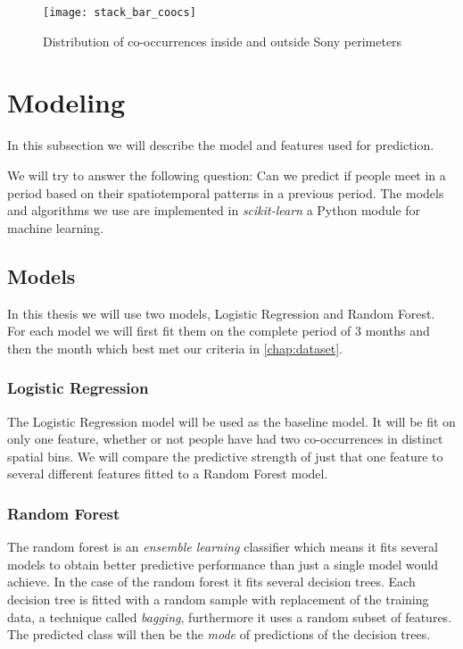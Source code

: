 \begin{figure}[H]
    \hspace*{-1.0cm}
    \centering
    \texttt{[image: stack\_bar\_coocs]}
    \caption{Distribution of co-occurrences inside and outside Sony perimeters}
    \label{fig:dist_coocs_sony}
\end{figure}

\section{Modeling}
In this subsection we will describe the model and features used for prediction.

We will try to answer the following question: Can we predict if people meet in a period based on their spatiotemporal patterns in a previous period.
The models and algorithms we use are implemented in \textit{scikit-learn}\cite{scikit-learn} a Python module for machine learning. 

\subsection{Models}
In this thesis we will use two models, Logistic Regression and Random Forest. For each model we will first fit them on the complete period of 3 months and then the month which best met our criteria in \autoref{chap:dataset}.

\subsubsection{Logistic Regression}
The Logistic Regression model will be used as the baseline model. It will be fit on only one feature, whether or not people have had two co-occurrences in distinct spatial bins. We will compare the predictive strength of just that one feature to several different features fitted to a Random Forest model.

\subsubsection{Random Forest}
The random forest is an \textit{ensemble learning} classifier which means it fits several models to obtain better predictive performance than just a single model would achieve. In the case of the random forest it fits several decision trees. Each decision tree is fitted with a random sample with replacement of the training data, a technique called \textit{bagging}, furthermore it uses a random subset of features. The predicted class will then be the \textit{mode} of predictions of the decision trees.


